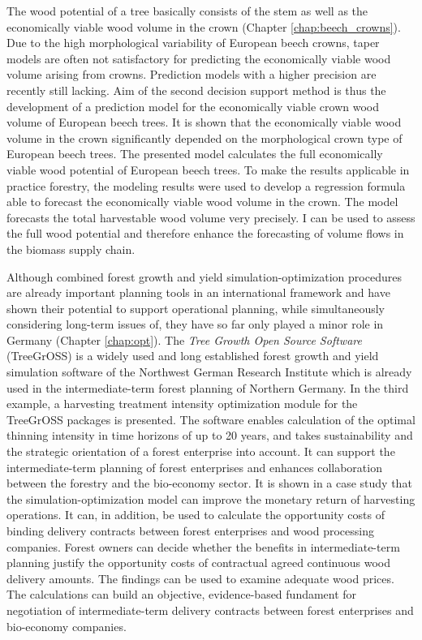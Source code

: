 The wood potential of a tree basically consists of the stem as well as the economically viable wood volume in the crown (Chapter \ref{chap:beech_crowns}). Due to the high morphological variability of European beech crowns, taper models are often not satisfactory for predicting the economically viable wood volume arising from crowns. Prediction models with a higher precision are recently still lacking. Aim of the second decision support method is thus the development of a prediction model for the economically viable crown wood volume of European beech trees. It is shown that the economically viable wood volume in the crown significantly depended on the morphological crown type of European beech trees. The presented model calculates the full economically viable wood potential of European beech trees. To make the results applicable in practice forestry, the modeling results were used to develop a regression formula able to forecast the economically viable wood volume in the crown. The model forecasts the total harvestable wood volume very precisely. I can be used to assess the full wood potential and therefore enhance the forecasting of volume flows in the biomass supply chain.

Although combined forest growth and yield si\-mu\-la\-tion-op\-ti\-mi\-za\-tion procedures are already important planning tools in an international framework and have shown their potential to support operational planning, while simultaneously considering long-term issues of, they have so far only played a minor role in Germany (Chapter \ref{chap:opt}). The \textit{Tree Growth Open Source Software} (TreeGrOSS) is a widely used and long established forest growth and yield simulation software of the Northwest German Research Institute which is already used in the intermediate-term forest planning of Northern Germany. In the third example, a harvesting treatment intensity optimization module for the TreeGrOSS packages is presented. The software enables calculation of the optimal thinning intensity in time horizons of up to 20 years, and takes sustainability and the strategic orientation of a forest enterprise into account. It can support the intermediate-term planning of forest enterprises and enhances collaboration between the forestry and the bio-economy sector. It is shown in a case study that the si\-mu\-la\-tion-op\-ti\-mi\-za\-tion model can improve the monetary return of harvesting operations. It can, in addition, be used to calculate the opportunity costs of binding delivery contracts between forest enterprises and wood processing companies. Forest owners can decide whether the benefits in intermediate-term planning justify the opportunity costs of contractual agreed continuous wood delivery amounts. The findings can be used to examine adequate wood prices. The calculations can build an objective, evidence-based fundament for negotiation of intermediate-term delivery contracts between forest enterprises and bio-economy companies.
